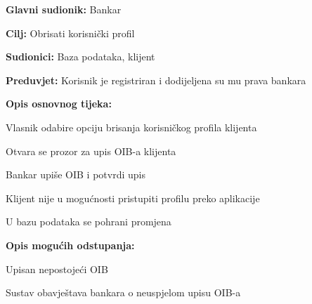                 
                \noindent {}
                \begin{packed_item}
                
                  \item \textbf{Glavni sudionik: }Bankar
                  \item  \textbf{Cilj:} Obrisati korisnički profil 
                  \item  \textbf{Sudionici:} Baza podataka, klijent
                  \item  \textbf{Preduvjet:} Korisnik je registriran i dodijeljena su mu prava bankara 
                  \item  \textbf{Opis osnovnog tijeka:}
              
              \item[] \begin{packed_enum}
                
                    \item  Vlasnik odabire  opciju brisanja korisničkog profila klijenta
                    \item  Otvara se prozor za upis OIB-a klijenta
                    \item  Bankar  upiše OIB  i potvrdi upis
                    \item  Klijent nije u mogućnosti pristupiti profilu preko aplikacije
                    \item  U bazu podataka se pohrani promjena 
                  \end{packed_enum}
                  
                  \item  \textbf{Opis mogućih odstupanja:}
                  
                  \item[] \begin{packed_enum}
                
                    \item[2.a] Upisan nepostojeći OIB
                    \item[] \begin{packed_enum}
                      
                      \item Sustav obavještava bankara o neuspjelom upisu OIB-a 
                
                    
                  \end{packed_enum}
                \end{packed_enum}
            \end{packed_item}
                
